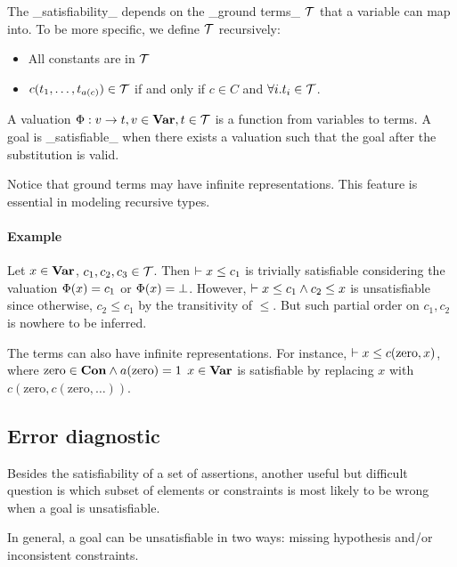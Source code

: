 The _satisfiability_ depends on the _ground terms_ $\mathcal{T}$ that a variable
can map into. To be more specific, we define $\mathcal{T}$ recursively: 

\begin{itemize}
\item All constants are in $\mathcal{T}$

\item $c(t_1, \dots, t_{a(c)})\in \mathcal{T}$ if and only if $c\in C$ and
$\forall i. t_i\in \mathcal{T}$.
\end{itemize}


A valuation $\Phi: v \to t, v\in \mathbf{Var}, t\in \mathcal{T}$ is a
function from variables to terms. A goal is _satisfiable_ when there
exists a valuation such that the goal after the substitution is valid. 

Notice that ground terms may have infinite representations. This feature is
essential in modeling recursive types.

\paragraph{Example}

Let $x\in \mathbf{Var}$, $c_1, c_2, c_3\in \mathcal{T}$. Then $\vdash x \leq c_1$ is
trivially satisfiable considering the valuation $\Phi(x)=c_1$ or
$\Phi(x)=\bot$. However, $\vdash x \leq c_1 \land c_2 \leq x$ is
unsatisfiable since otherwise, $c_2 \leq c_1$ by the transitivity of $\leq$.
But such partial order on $c_1, c_2$ is nowhere to be inferred.

The terms can also have infinite representations. For instance, $\vdash x \leq
c(\text{zero}, x)$, where $\text{zero} \in \mathbf{Con} \land a(\text{zero})=1$
$x\in \mathbf{Var}$ is satisfiable by replacing $x$ with $c(\text{zero},
c(\text{zero}, \dots))$.    

\subsection{Error diagnostic}

Besides the satisfiability of a set of assertions, another useful but difficult
question is which subset of elements or constraints is most likely to be wrong
when a goal is unsatisfiable. 

In general, a goal can be unsatisfiable in two ways: missing hypothesis and/or
inconsistent constraints.

